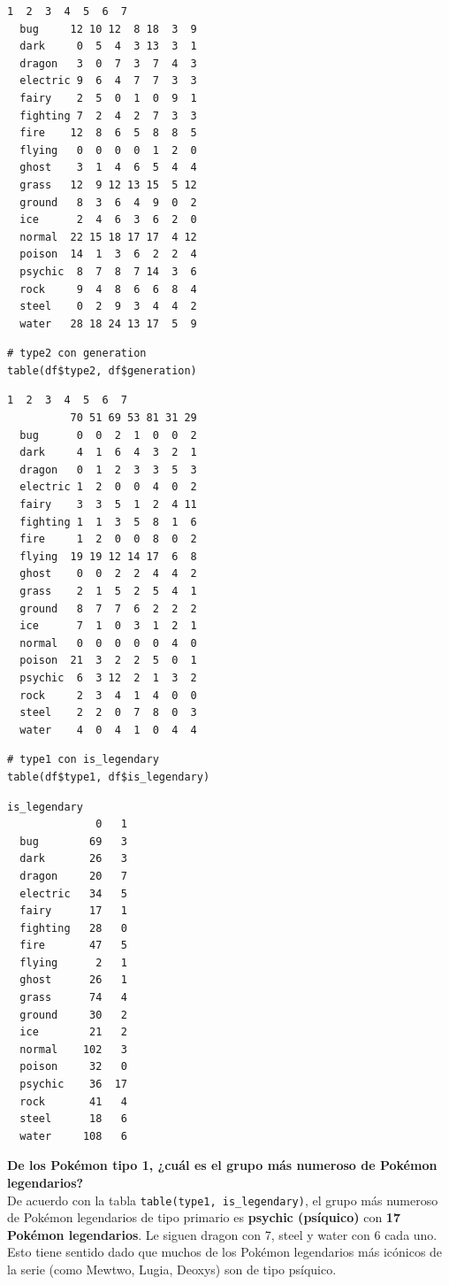 \documentclass[11pt,a4paper]{article}
\begin{document}
\begin{lstlisting}[style=Routput]
           1  2  3  4  5  6  7
  bug     12 10 12  8 18  3  9
  dark     0  5  4  3 13  3  1
  dragon   3  0  7  3  7  4  3
  electric 9  6  4  7  7  3  3
  fairy    2  5  0  1  0  9  1
  fighting 7  2  4  2  7  3  3
  fire    12  8  6  5  8  8  5
  flying   0  0  0  0  1  2  0
  ghost    3  1  4  6  5  4  4
  grass   12  9 12 13 15  5 12
  ground   8  3  6  4  9  0  2
  ice      2  4  6  3  6  2  0
  normal  22 15 18 17 17  4 12
  poison  14  1  3  6  2  2  4
  psychic  8  7  8  7 14  3  6
  rock     9  4  8  6  6  8  4
  steel    0  2  9  3  4  4  2
  water   28 18 24 13 17  5  9
\end{lstlisting}

\begin{lstlisting}[style=Rstyle]
# type2 con generation
table(df$type2, df$generation)
\end{lstlisting}

\begin{lstlisting}[style=Routput]
           1  2  3  4  5  6  7
          70 51 69 53 81 31 29
  bug      0  0  2  1  0  0  2
  dark     4  1  6  4  3  2  1
  dragon   0  1  2  3  3  5  3
  electric 1  2  0  0  4  0  2
  fairy    3  3  5  1  2  4 11
  fighting 1  1  3  5  8  1  6
  fire     1  2  0  0  8  0  2
  flying  19 19 12 14 17  6  8
  ghost    0  0  2  2  4  4  2
  grass    2  1  5  2  5  4  1
  ground   8  7  7  6  2  2  2
  ice      7  1  0  3  1  2  1
  normal   0  0  0  0  0  4  0
  poison  21  3  2  2  5  0  1
  psychic  6  3 12  2  1  3  2
  rock     2  3  4  1  4  0  0
  steel    2  2  0  7  8  0  3
  water    4  0  4  1  0  4  4
\end{lstlisting}

\begin{lstlisting}[style=Rstyle]
# type1 con is_legendary
table(df$type1, df$is_legendary)
\end{lstlisting}

\begin{lstlisting}[style=Routput]
           is_legendary
              0   1
  bug        69   3
  dark       26   3
  dragon     20   7
  electric   34   5
  fairy      17   1
  fighting   28   0
  fire       47   5
  flying      2   1
  ghost      26   1
  grass      74   4
  ground     30   2
  ice        21   2
  normal    102   3
  poison     32   0
  psychic    36  17
  rock       41   4
  steel      18   6
  water     108   6
\end{lstlisting}

\begin{pregunta}
\textbf{De los Pokémon tipo 1, ¿cuál es el grupo más numeroso de Pokémon legendarios?}\\[4pt]
De acuerdo con la tabla \texttt{table(type1, is\_legendary)}, el grupo más numeroso de Pokémon
legendarios de tipo primario es \textbf{psychic (psíquico)} con \textbf{17 Pokémon legendarios}.
Le siguen dragon con 7, steel y water con 6 cada uno. Esto tiene sentido dado que muchos de los
Pokémon legendarios más icónicos de la serie (como Mewtwo, Lugia, Deoxys) son de tipo psíquico.
\end{pregunta}
\end{document}

